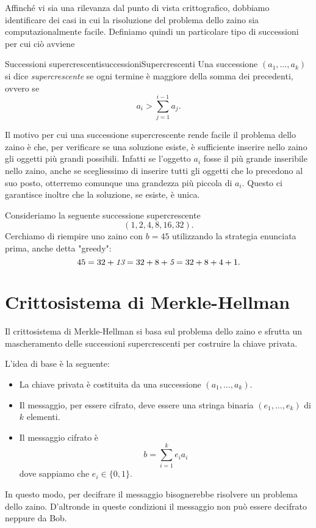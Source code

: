 	Affinché vi sia una rilevanza dal punto di vista crittografico, dobbiamo identificare dei casi in cui la risoluzione del problema dello zaino sia computazionalmente facile. Definiamo quindi un particolare tipo di successioni per cui ciò avviene

	\begin{defn}{Successioni supercrescenti}{successioniSupercrescenti}
	Una successione \((a_1,\ldots,a_k)\) si dice \emph{supercrescente} se ogni termine è maggiore della somma dei precedenti, ovvero se
		\[
		a_i > \sum_{j=1}^{i-1} a_j.
		\]
	\end{defn}
	\noindent
	Il motivo per cui una successione supercrescente rende facile il problema dello zaino è che, per verificare se una soluzione esiste, è sufficiente inserire nello zaino gli oggetti più grandi possibili.
	Infatti se l'oggetto \(a_i\) fosse il più grande inseribile nello zaino, anche se scegliessimo di inserire tutti gli oggetti che lo precedono al suo posto, otterremo comunque una grandezza più piccola di \(a_i\).
	Questo ci garantisce inoltre che la soluzione, se esiste, è unica.

	\begin{ese}
	Consideriamo la seguente successione supercrescente
		\[
		(1,2,4,8,16,32).
		\]
	Cerchiamo di riempire uno zaino con \(b=45\) utilizzando la strategia enunciata prima, anche detta "greedy":
	\[
	45 = 32+\emph{13} = 32+8+\emph{5} = 32+8+4+1.
	\]
	\end{ese}
\section{Crittosistema di Merkle-Hellman}

	Il crittosistema di Merkle-Hellman si basa sul problema dello zaino e sfrutta un mascheramento delle successioni supercrescenti per costruire la chiave privata.

	L'idea di base è la seguente:
	\begin{itemize}
		\item La chiave privata è costituita da una successione \((a_1,\ldots,a_k)\).
		\item Il messaggio, per essere cifrato, deve essere una stringa binaria \((e_1,\ldots,e_k)\) di \(k\) elementi.
		\item Il messaggio cifrato è
			\[
			b = \sum_{i=1}^k e_i a_i
			\]
		dove sappiamo che \(e_i\in\{0,1\}\).
	\end{itemize}
	In questo modo, per decifrare il messaggio bisognerebbe risolvere un problema dello zaino.
	D'altronde in queste condizioni il messaggio non può essere decifrato neppure da Bob.

